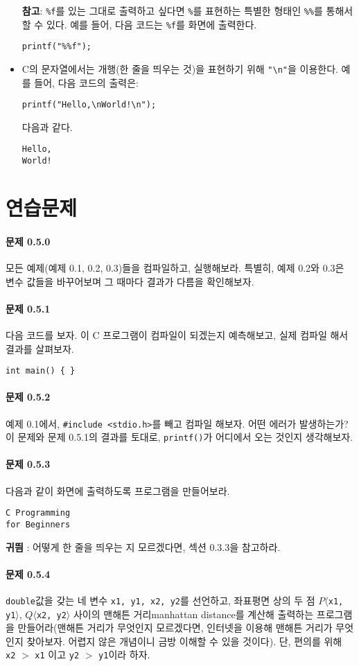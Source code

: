 \documentclass[../main.tex]{subfiles}
\begin{document}
\begin{itemize}
  \textbf{참고}: \texttt{\%f}를 있는 그대로 출력하고 싶다면
  \texttt{\%}를 표현하는 특별한 형태인 \texttt{\%\%}를 통해서 할 수
  있다. 예를 들어, 다음 코드는 \texttt{\%f}를 화면에 출력한다.
\begin{verbatim}
printf("%%f");
\end{verbatim}
\item C의 문자열에서는 개행(한 줄을 띄우는 것)을 표현하기 위해
  \texttt{"\textbackslash{}n"}을 이용한다. 예를 들어, 다음 코드의
  출력은:
\begin{verbatim}
printf("Hello,\nWorld!\n");
\end{verbatim}
  다음과 같다.
\begin{verbatim}
Hello,
World!
\end{verbatim}
\end{itemize}

\section{연습문제}
\paragraph{문제 0.5.0} 모든 예제(예제 0.1, 0.2, 0.3)들을 컴파일하고,
실행해보라. 특별히, 예제 0.2와 0.3은 변수 값들을 바꾸어보며 그 때마다
결과가 다름을 확인해보자.
\paragraph{문제 0.5.1} 다음 코드를 보자. 이 C 프로그램이 컴파일이
되겠는지 예측해보고, 실제 컴파일 해서 결과를 살펴보자.
\begin{verbatim}
int main() { }
\end{verbatim}
\paragraph{문제 0.5.2} 예제 0.1에서, \verb|#include <stdio.h>|를 빼고
컴파일 해보자. 어떤 에러가 발생하는가? 이 문제와 문제 0.5.1의 결과를
토대로, \texttt{printf()}가 어디에서 오는 것인지 생각해보자.
\paragraph{문제 0.5.3} 다음과 같이 화면에 출력하도록 프로그램을
만들어보라.
\begin{verbatim}
C Programming
for Beginners
\end{verbatim}
\textbf{귀띔} : 어떻게 한 줄을 띄우는 지 모르겠다면, 섹션 0.3.3을
참고하라.
\paragraph{문제 0.5.4} \texttt{double}값을 갖는 네 변수 \texttt{x1,
  y1, x2, y2}를 선언하고, 좌표평면 상의 두 점 $P\langle{}$\texttt{x1,
  y1}$\rangle{}$, $Q\langle{}$\texttt{x2, y2}$\rangle{}$ 사이의 맨해튼
거리\small{manhattan distance}를 계산해 출력하는 프로그램을
만들어라(맨해튼 거리가 무엇인지 모르겠다면, 인터넷을 이용해 맨해튼
거리가 무엇인지 찾아보자. 어렵지 않은 개념이니 금방 이해할 수 있을
것이다). 단, 편의를 위해 \texttt{x2} $>$ \texttt{x1} 이고 \texttt{y2}
$>$ \texttt{y1}이라 하자.
\end{document}
